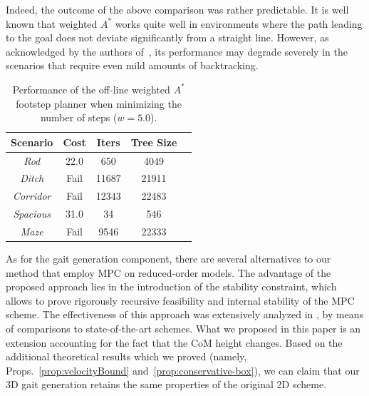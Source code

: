 Indeed, the outcome of the above comparison was rather predictable.
It is well known that weighted $A^\ast$ works quite well in environments where the path leading to the goal does not deviate significantly from a straight line. However, as acknowledged by the authors of~\cite{Griffin_ICRA2019}, its performance may degrade severely in the scenarios that require even mild amounts of backtracking. 

\begin{table}
    \centering
    \begin{tabular}{*{5}{c}}
        Scenario & Cost & Iters & Tree Size \\
        \hline
        \textit{Rod} & 22.0 & 650 & 4049 \\
        \textit{Ditch} & Fail & 11687 & 21911 \\
        \textit{Corridor} & Fail & 12343 & 22483 \\
        \textit{Spacious} & 31.0 & 34 & 546 \\
        \textit{Maze} & Fail & 9546 & 22333
    \end{tabular}
    \caption{Performance of the off-line weighted $A^\ast$ footstep planner when minimizing the number of steps ($w=5.0$).}
    \label{tab:benchmark-wastar-w5}
\end{table}

As for the gait generation component, there are several alternatives to our method that employ MPC on reduced-order models. The advantage of the proposed approach lies in the introduction of the stability constraint, which allows to prove rigorously recursive feasibility and internal stability of the MPC scheme. The effectiveness of this approach was extensively analyzed in \cite{ScDeLaOr:20}, by means of comparisons to state-of-the-art schemes. What we proposed in this paper is an extension accounting for the fact that the CoM height changes. Based on the additional theoretical results which we proved (namely, Props.~\ref{prop:velocityBound} and~\ref{prop:conservative-box}), we can claim that our 3D gait generation retains the same properties of the original 2D scheme. 

